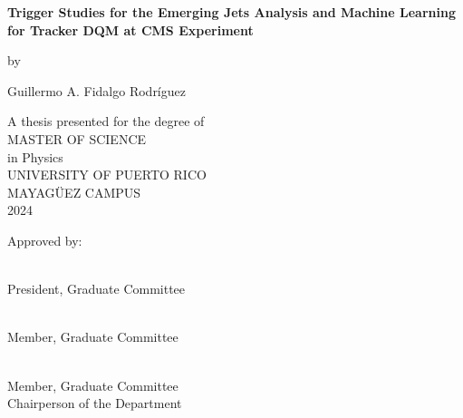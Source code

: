 \begin{titlepage}
    \begin{center}

      {\large  
        \textbf{Trigger Studies for the Emerging Jets Analysis and Machine Learning for Tracker DQM at CMS Experiment}
       }
       
        \normalsize
        \vspace{0.55cm}
        by
        
        \vspace{0.55cm}
        
        \large
        Guillermo A. Fidalgo Rodríguez         
        \vspace{1cm}	
        
        A thesis presented for the degree of\\
        \vspace{0.5cm}
        MASTER OF SCIENCE \\
        in
        Physics\\
        UNIVERSITY OF PUERTO RICO\\
        MAYAGÜEZ CAMPUS\\
        2024
        \vspace{1.8cm}
        
        \end{center}
        
        Approved by:
        
        \vspace{2.0cm}

\\President, Graduate Committee

\vspace{2.0cm}

\\Member, Graduate Committee

\vspace{2.0cm}

\\Member, Graduate Committee
\\Chairperson of the Department




\end{titlepage}